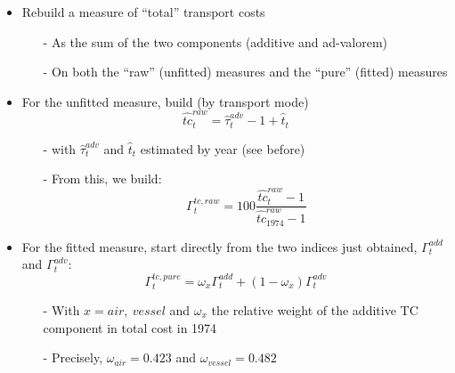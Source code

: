 \documentclass[10 pt,Helvetica, french]{beamer}
\begin{document}
\begin{frame}
\begin{itemize}
\item Rebuild a measure of ``total'' transport costs  \vspace{0.1cm}
\begin{itemize}
\item[-] As the sum of the two components (additive and ad-valorem) \vspace{0.1cm}
\item[-] On both the ``raw'' (unfitted) measures and the ``pure'' (fitted) measures \vspace{0.1cm}
\end{itemize}
\item For the unfitted measure, build (by transport mode)
\footnotesize
$$\widehat{tc}^{raw}_t= \widehat{\tau}^{adv}_t -1 + \widehat{t}_t$$
\normalsize
\begin{itemize}
\item[-] with $\widehat{\tau}^{adv}_t$ and $\widehat{t}_t$ estimated by year (see before) \vspace{0.1cm}
\item[-] From this, we build:
\footnotesize
$$\Gamma^{tc, raw}_t = 100\frac{\widehat{tc}^{raw}_t -1 }{\widehat{tc}^{raw}_{1974}-1}$$
\normalsize
\end{itemize}
\item For the fitted measure, start directly from the two indices just obtained, $\Gamma^{add}_t$ and $\Gamma_{t}^{adv}$:
\footnotesize
$$\Gamma^{tc, pure}_t = \omega_{x}\Gamma^{add}_t +(1-\omega_{x})\Gamma^{adv}_t $$
\normalsize
\begin{itemize}
\item[-] With $x={air, ~vessel}$ and $\omega_x$ the relative weight of the additive TC component in total cost in 1974 \vspace{0.1cm}
\item[-] Precisely, $\omega_{air}= 0.423$ and $\omega_{vessel}= 0.482$
\end{itemize}
\end{itemize}
\hyperlink{slide_compeffects_strategy}{}
\end{frame}
\end{document}
